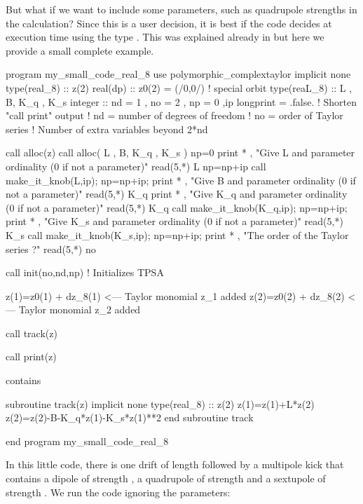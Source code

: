 \documentclass[english,12pt,article]{article} %
\begin{document}
But what if we want to include some parameters, such as quadrupole strengths in the calculation? Since this is a user decision, it is best if the code decides at execution time using the type  .  This was explained already  in  but here we provide a small complete example.

\begin{code}
program my_small_code_real_8
use polymorphic_complextaylor
implicit none
type(real_8) :: z(2)  
real(dp) :: z0(2) = (/0,0/)  ! special orbit
type(reaL_8)  :: L , B, K_q , K_s 
integer :: nd = 1 , no = 2 , np = 0 ,ip
longprint = .false.         ! Shorten "call print" output
! nd = number of degrees of freedom
! no =  order of Taylor series
! Number of extra variables beyond 2*nd

call alloc(z)
call alloc( L , B, K_q , K_s )
np=0
print * , "Give  L and parameter ordinality (0 if not a parameter)"
read(5,*) L%
np=np+ip
call make_it_knob(L,ip);  np=np+ip;
print * , "Give  B  and parameter ordinality (0 if not a parameter)"
read(5,*) K_q%
print * , "Give  K_q and parameter ordinality (0 if not a parameter)"
read(5,*) K_q%
call make_it_knob(K_q,ip);  np=np+ip;
print * , "Give  K_s and parameter ordinality (0 if not a parameter)"
read(5,*) K_s%
call make_it_knob(K_s,ip); np=np+ip;
print * , "The order of the Taylor series ?"
read(5,*) no

call init(no,nd,np) ! Initializes TPSA 

z(1)=z0(1) + dz_8(1) <--- Taylor monomial z_1 added
z(2)=z0(2) + dz_8(2) <--- Taylor monomial z_2 added

call track(z)

call print(z)

contains

subroutine track(z)
implicit none
type(real_8) :: z(2) 
 z(1)=z(1)+L*z(2) 
 z(2)=z(2)-B-K_q*z(1)-K_s*z(1)**2 
end subroutine track

end program my_small_code_real_8
\end{code}

In this little code, there is one drift of length  followed by a multipole kick that contains a dipole of strength , a quadrupole of strength  and a sextupole of strength . We run the code ignoring the parameters:
\end{document}
